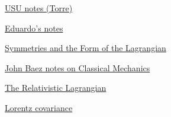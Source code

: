 \begin{thebibliography}

 \href{http://www.physics.usu.edu/torre/6010_Fall_2010/Lectures/04.pdf}{USU notes (Torre)}

 \href{http://eduardo.physics.illinois.edu/phys582/582-chapter3.pdf}{Eduardo's notes}

 \href{http://home.strw.leidenuniv.nl/~icke/ps/SymmetryLagrangian.pdf}{Symmetries and the Form of the Lagrangian}

 \href{http://math.ucr.edu/home/baez/classical/texfiles/2005/book/classical.pdf}{John Baez notes on Classical Mechanics}

 \href{http://fma.if.usp.br/~amsilva/Livros/Zwiebach/chapter5.pdf}{The Relativistic Lagrangian}

 \href{http://eagle.phys.utk.edu/guidry/astro490/lectures/lecture490_ch4.pdf}{Lorentz covariance}


\end{thebibliography}
